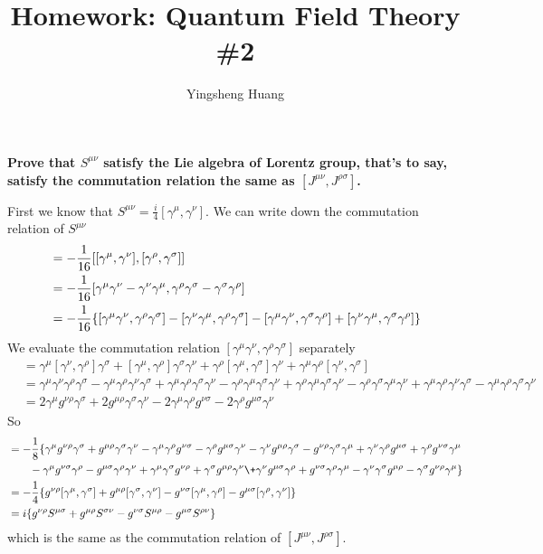 \documentclass{article}
\title{Homework: Quantum Field Theory \#2}
\author{Yingsheng Huang}
\newcommand{\gm}{\gamma^{\mu}}
\newcommand{\gn}{\gamma^{\nu}}
\newcommand{\gs}{\gamma^{\sigma}}
\newcommand{\gr}{\gamma^{\rho}}
\newcommand{\gnr}{g^{\nu\rho}}
\newcommand{\gmr}{g^{\mu\rho}}
\newcommand{\gms}{g^{\mu\sigma}}
\newcommand{\gns}{g^{\nu\sigma}}
\begin{document}
\maketitle
{\bf Prove that $S^{\mu\nu}$ satisfy the Lie algebra of Lorentz group, that's to say, satisfy the commutation relation the same as $[J^{\mu\nu},J^{\rho\sigma}]$.}

First we know that $S^{\mu\nu}=\frac{i}{4}[\gamma^{\mu},\gamma^{\nu}]$. We can write down the commutation relation of $S^{\mu\nu}$
\begin{align*}
  [S^{\mu\nu},S^{\rho\sigma}]&=-\frac{1}{16}[[\gamma^{\mu},\gamma^{\nu}],[\gamma^{\rho},\gamma^{\sigma}]]\\
  &=-\frac{1}{16}[\gamma^{\mu}\gamma^{\nu}-\gamma^{\nu}\gamma^{\mu},\gamma^{\rho}\gamma^{\sigma}-\gamma^{\sigma}\gamma^{\rho}]\\
  &=-\frac{1}{16}\Bqty{[\gm\gn,\gr\gs]-[\gn\gm,\gr\gs]-[\gm\gn,\gs\gr]+[\gn\gm,\gs\gr]}
\end{align*}
We evaluate the commutation relation $[\gm\gn,\gr\gs]$ separately
\begin{align*}
  [\gm\gn,\gr\gs]&=\gm[\gn,\gr]\gs+[\gm,\gr]\gs\gn+\gr[\gm,\gs]\gn+\gm\gr[\gn,\gs]\\
  &=\gm\gn\gr\gs-\gm\gr\gn\gs+\gm\gr\gs\gn-\gr\gm\gs\gn+\gr\gm\gs\gn-\gr\gs\gm\gn+\gm\gr\gn\gs-\gm\gr\gs\gn\\
  &=2\gm\gnr\gs+2\gmr\gs\gn-2\gm\gr\gns-2\gr\gms\gn
\end{align*}
So
\begin{align*}
  [S^{\mu\nu},S^{\rho\sigma}]&=-\frac{1}{8}\{\gm\gnr\gs+\gmr\gs\gn-\gm\gr\gns-\gr\gms\gn-\gn\gmr\gs-\gnr\gs\gm+\gn\gr\gms+\gr\gns\gm\\&\;\;\;\;\;\;\;-\gm\gns\gr-\gms\gr\gn+\gm\gs\gnr+\gs\gmr\gn\+\gn\gms\gr+\gns\gr\gm-\gn\gs\gmr-\gs\gnr\gm\}\\
  &=-\frac{1}{4}\{\gnr[\gm,\gs]+\gmr[\gs,\gn]-\gns[\gm,\gr]-\gms[\gr,\gn]\}\\
  &=i\{\gnr S^{\mu\sigma}+\gmr S^{\sigma\nu}-\gns S^{\mu\rho}-\gms S^{\rho\nu}\}
\end{align*}
which is the same as the commutation relation of $[J^{\mu\nu},J^{\rho\sigma}]$.
\end{document}
